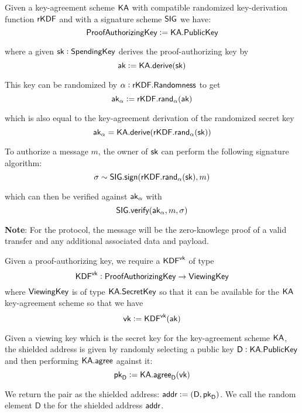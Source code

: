 \begin{definition}
    Given a key-agreement scheme ${\textsf{KA}}$ with compatible randomized key-derivation function ${\textsf{rKDF}}$ and with a signature scheme ${\textsf{SIG}}$ we have:
    \[{\textsf{ProofAuthorizingKey}} := {\textsf{KA}}.{\textsf{PublicKey}}\]

    where a given ${\textsf{sk}} : {\textsf{SpendingKey}}$ derives the proof-authorizing key by
    \[{\textsf{ak}} := {\textsf{KA}}.{\textsf{derive}}({\textsf{sk}})\]

    This key can be randomized by $\alpha : {\textsf{rKDF}}.{\textsf{Randomness}}$ to get
    \[{\textsf{ak}}_\alpha := {\textsf{rKDF}}.{\textsf{rand}}_\alpha({\textsf{ak}})\]

    which is also equal to the key-agreement derivation of the randomized secret key
    \[{\textsf{ak}}_\alpha = {\textsf{KA}}.{\textsf{derive}}({\textsf{rKDF}}.{\textsf{rand}}_\alpha({\textsf{sk}}))\]

    To authorize a message $m$, the owner of ${\textsf{sk}}$ can perform the following signature algorithm:
    \[\sigma \sim {\textsf{SIG}}.{\textsf{sign}}({\textsf{rKDF}}.{\textsf{rand}}_\alpha({\textsf{sk}}), m)\]

    which can then be verified against ${\textsf{ak}}_\alpha$ with
    \[{\textsf{SIG}}.{\textsf{verify}}({\textsf{ak}}_\alpha, m, \sigma)\]

    \textbf{Note}: For the \Transfer{} protocol, the message will be the zero-knowlege proof of a valid transfer and any additional associated data and \Ledger{} payload.
\end{definition}

\begin{definition}
    Given a proof-authorizing key, we require a ${\textsf{KDF}}^{\textsf{vk}}$ of type
    \[{\textsf{KDF}}^{\textsf{vk}} : {\textsf{ProofAuthorizingKey}} \to {\textsf{ViewingKey}}\]
    where ${\textsf{ViewingKey}}$ is of type ${\textsf{KA}}.{\textsf{SecretKey}}$ so that it can be available for the ${\textsf{KA}}$ key-agreement scheme so that we have
    \[{\textsf{vk}} := {\textsf{KDF}}^{\textsf{vk}}({\textsf{ak}})\]
\end{definition}

\begin{definition}
    Given a viewing key which is the secret key for the key-agreement scheme ${\textsf{KA}}$, the shielded address is given by randomly selecting a public key $\textsf{D} : {\textsf{KA}}.{\textsf{PublicKey}}$ and then performing ${\textsf{KA}}.{\textsf{agree}}$ against it:
    \[{\textsf{pk}}_\textsf{D} := {\textsf{KA}}.{\textsf{agree}}_\textsf{D}({\textsf{vk}})\]

    We return the pair as the shielded address: ${\textsf{addr}} := (\textsf{D}, {\textsf{pk}}_\textsf{D})$. We call the random element $\textsf{D}$ the \Diversifier{} for the shielded address ${\textsf{addr}}$.
\end{definition}

